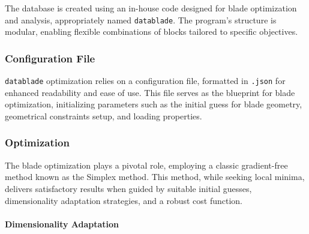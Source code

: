 \documentclass[11pt,a4paper,twocolumn]{article}
\begin{document}
The database is created using an in-house code designed for blade optimization and analysis, appropriately named \texttt{datablade}. The program's structure is modular, enabling flexible combinations of blocks tailored to specific objectives.

\subsubsection{Configuration File}

\texttt{datablade} optimization relies on a configuration file, formatted in \texttt{.json} for enhanced readability and ease of use. This file serves as the blueprint for blade optimization, initializing parameters such as the initial guess for blade geometry, geometrical constraints setup, and loading properties.

\subsubsection{Optimization}

The blade optimization plays a pivotal role, employing a classic gradient-free method known as the Simplex method. This method, while seeking local minima, delivers satisfactory results when guided by suitable initial guesses, dimensionality adaptation strategies, and a robust cost function.

\paragraph{Dimensionality Adaptation}
\end{document}
